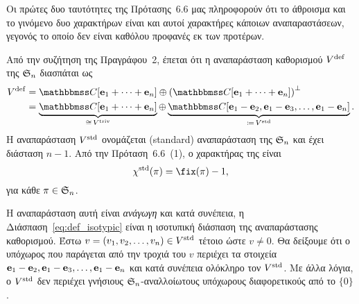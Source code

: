 \documentclass[12pt,a4paper,reqno]{amsart}
\newcommand{\defn}[1]{{\color{mylightblue}{#1}}}
\begin{document}
Οι πρώτες δυο ταυτότητες της Πρότασης~6.6 μας πληροφορούν ότι το άθροισμα και το γινόμενο δυο χαρακτήρων είναι και αυτοί χαρακτήρες κάποιων αναπαραστάσεων, γεγονός το οποίο δεν είναι καθόλου προφανές εκ των προτέρων.
\begin{example}
    Από την συζήτηση της Πραγράφου~2, έπεται ότι η αναπαράσταση καθορισμού $V^{\mathrm{def}}$ της $\mathfrak{S}_n$ διασπάται ως 
    \begin{align}
    V^{\rmdef} &= \CC[\bfe_1 + \cdots + \bfe_n] \oplus \left(\CC[\bfe_1 + \cdots + \bfe_n]\right)^\perp \notag \\
    &= \underbrace{\CC[\bfe_1 + \cdots + \bfe_n]}_{\cong \, V^{\triv}} \oplus \underbrace{\CC[\bfe_1-\bfe_2, \bfe_1 - \bfe_3, \dots, \bfe_1 - \bfe_n]}_{\coloneqq \, V^{\std}}. \label{eq:def_isotypic}
    \end{align}
    Η αναπαράσταση $V^{\mathrm{std}}$ ονομάζεται \defn{συνήθης} (standard) αναπαράσταση της $\mathfrak{S}_n$ και έχει διάσταση $n-1$. Από την Πρόταση~6.6~(1), ο χαρακτήρας της είναι 
    \[
    \chi^\std(\pi) = \fix(\pi) - 1,
    \]
    για κάθε $\pi \in \mathfrak{S}_n$.

    H αναπαράσταση αυτή είναι \emph{ανάγωγη} και κατά συνέπεια, η Διάσπαση~\eqref{eq:def_isotypic} είναι η ισοτυπική διάσπαση της αναπαράστασης καθορισμού. Έστω $v = (v_1, v_2, \dots, v_n) \in V^{\mathrm{std}}$ τέτοιο ώστε $v \neq 0$. Θα δείξουμε ότι ο υπόχωρος που παράγεται από την τροχιά του $v$ περιέχει τα στοιχεία $\mathbf{e}_1 - \mathbf{e}_2, \mathbf{e}_1 - \mathbf{e}_3, \dots, \mathbf{e}_1-\mathbf{e}_n$ και κατά συνέπεια ολόκληρο τον $V^{\mathrm{std}}$. Με άλλα λόγια, ο $V^{\mathrm{std}}$ δεν περιέχει γνήσιους $\mathfrak{S}_n$-αναλλοίωτους υπόχωρους διαφορετικούς από το $\{0\}$. 


\end{example}
\end{document}
